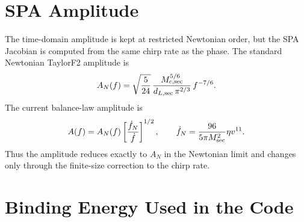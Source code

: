 \documentclass[11pt]{article}
\begin{document}
\section{SPA Amplitude}

The time-domain amplitude is kept at restricted Newtonian order, but the SPA
Jacobian is computed from the same chirp rate as the phase.  The standard
Newtonian TaylorF2 amplitude is
\begin{equation}
  A_N(f)
  =
  \sqrt{\frac{5}{24}}\,
  \frac{M_{c,{\rm sec}}^{5/6}}{d_{L,{\rm sec}}\,\pi^{2/3}}\,
  f^{-7/6}.
\end{equation}
The current balance-law amplitude is
\begin{equation}
  A(f)
  =
  A_N(f)
  \left[
    \frac{\dot f_N}{\dot f}
  \right]^{1/2},
  \qquad
  \dot f_N =
  \frac{96}{5\pi M_{\rm sec}^2}\eta v^{11}.
  \label{eq:balance-amplitude}
\end{equation}
Thus the amplitude reduces exactly to \(A_N\) in the Newtonian limit and
changes only through the finite-size correction to the chirp rate.

\section{Binding Energy Used in the Code}
\end{document}
